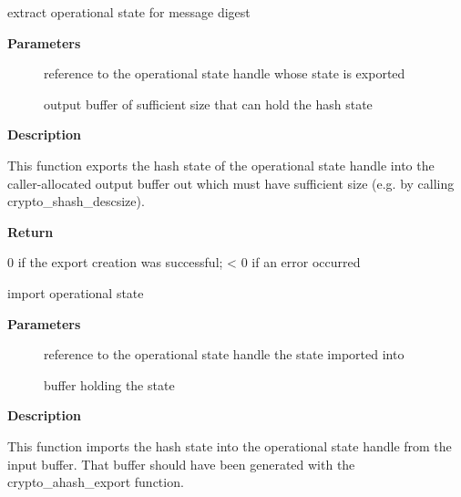 \documentclass[a4paper,8pt,english]{sphinxmanual}
\begin{document}
\begin{fulllineitems}
\label{crypto/api-digest:c.crypto_shash_export}
extract operational state for message digest

\end{fulllineitems}


\textbf{Parameters}
\begin{description}
\item[{}] \leavevmode
reference to the operational state handle whose state is exported

\item[{}] \leavevmode
output buffer of sufficient size that can hold the hash state

\end{description}

\textbf{Description}

This function exports the hash state of the operational state handle into the
caller-allocated output buffer out which must have sufficient size (e.g. by
calling crypto\_shash\_descsize).

\textbf{Return}

0 if the export creation was successful; \textless{} 0 if an error occurred

\begin{fulllineitems}
\label{crypto/api-digest:c.crypto_shash_import}
import operational state

\end{fulllineitems}


\textbf{Parameters}
\begin{description}
\item[{}] \leavevmode
reference to the operational state handle the state imported into

\item[{}] \leavevmode
buffer holding the state

\end{description}

\textbf{Description}

This function imports the hash state into the operational state handle from
the input buffer. That buffer should have been generated with the
crypto\_ahash\_export function.
\end{document}
